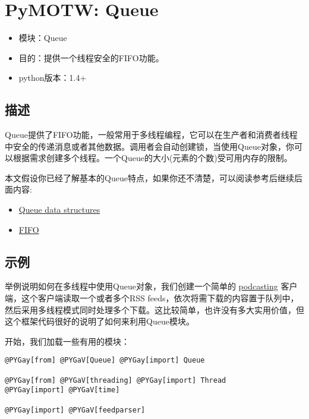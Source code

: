 \documentclass[a4paper,10pt,english]{manual}
\begin{document}
\resetcurrentobjects

\clearpage
\section{PyMOTW: Queue}
\begin{itemize}
\item {} 
模块：Queue

\item {} 
目的：提供一个线程安全的FIFO功能。

\item {} 
python版本：1.4+

\end{itemize}


\subsection{描述}

Queue提供了FIFO功能，一般常用于多线程编程，它可以在生产者和消费者线程中安全的传递消息或者其他数据。调用者会自动创建锁，当使用Queue对象，你可以根据需求创建多个线程。一个Queue的大小(元素的个数)受可用内存的限制。

本文假设你已经了解基本的Queue特点，如果你还不清楚，可以阅读参考后继续后面内容:
\begin{itemize}
\item {} 
\href{http://en.wikipedia.org/wiki/Queue\_\%28data\_structure}{Queue data structures}

\item {} 
\href{http://en.wikipedia.org/wiki/FIFO}{FIFO}

\end{itemize}


\subsection{示例}

举例说明如何在多线程中使用Queue对象，我们创建一个简单的 \href{http://en.wikipedia.org/wiki/Podcasting}{podcasting} 客户端，这个客户端读取一个或者多个RSS feeds，依次将需下载的内容置于队列中，然后采用多线程模式同时处理多个下载。这比较简单，也许没有多大实用价值，但这个框架代码很好的说明了如何来利用Queue模块。

开始，我们加载一些有用的模块：

\begin{Verbatim}[commandchars=@\[\]]
@PYGay[from] @PYGaV[Queue] @PYGay[import] Queue

@PYGay[from] @PYGaV[threading] @PYGay[import] Thread
@PYGay[import] @PYGaV[time]

@PYGay[import] @PYGaV[feedparser]
\end{Verbatim}
\end{document}
